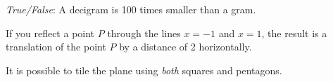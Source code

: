 \documentclass[11pt,letterpaper]{article}
\begin{document}
\quizsol \textit{True/False}: A decigram is 100 times smaller than a gram. 




If you reflect a point $P$ through the lines $x= -1$ and $x= 1$, the result is a translation of the point $P$ by a distance of 2 horizontally. 



It is possible to tile the plane using \textit{both} squares and pentagons. 
\end{document}
